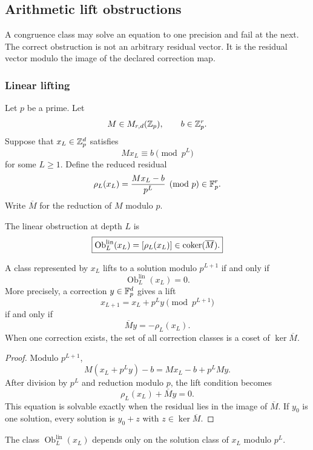 \subsection{Arithmetic lift obstructions}\label{hist:sec:lifting}

A congruence class may solve an equation to one precision and fail at the next. The correct obstruction is not an arbitrary residual vector. It is the residual vector modulo the image of the declared correction map.

\subsubsection{Linear lifting}

Let \(p\) be a prime. Let
\[
M\in M_{r,d}(\mathbb Z_p),
\qquad
b\in\mathbb Z_p^r.
\]
Suppose that \(x_L\in\mathbb Z_p^d\) satisfies
\[
Mx_L\equiv b\pmod {p^L}
\]
for some \(L\geq1\). Define the reduced residual
\[
\rho_L(x_L)
=
\frac{Mx_L-b}{p^L}
\pmod p
\in\mathbb F_p^r.
\]
Write \(\overline M\) for the reduction of \(M\) modulo \(p\).

\begin{histdefinition}\label{hist:def:linear_lift_obstruction}
The linear obstruction at depth \(L\) is
\[
\boxed{
\operatorname{Ob}^{\mathrm{lin}}_L(x_L)
=
[\rho_L(x_L)]
\in
\operatorname{coker}(\overline M).
}
\]
\end{histdefinition}

\begin{histtheorem}\label{hist:thm:linear_lifting}
A class represented by \(x_L\) lifts to a solution modulo \(p^{L+1}\) if and only if
\[
\boxed{
\operatorname{Ob}^{\mathrm{lin}}_L(x_L)=0.
}
\]
More precisely, a correction \(y\in\mathbb F_p^d\) gives a lift
\[
x_{L+1}=x_L+p^Ly
\pmod {p^{L+1}}
\]
if and only if
\[
\boxed{
\overline My=-\rho_L(x_L).
}
\]
When one correction exists, the set of all correction classes is a coset of \(\ker\overline M\).
\end{histtheorem}

\begin{proof}
Modulo \(p^{L+1}\),
\[
M(x_L+p^Ly)-b
=
Mx_L-b+p^LMy.
\]
After division by \(p^L\) and reduction modulo \(p\), the lift condition becomes
\[
\rho_L(x_L)+\overline My=0.
\]
This equation is solvable exactly when the residual lies in the image of \(\overline M\). If \(y_0\) is one solution, every solution is \(y_0+z\) with \(z\in\ker\overline M\).
\end{proof}

\begin{histproposition}\label{hist:prop:linear_obstruction_independence}
The class \(\operatorname{Ob}^{\mathrm{lin}}_L(x_L)\) depends only on the solution class of \(x_L\) modulo \(p^L\).
\end{histproposition}

